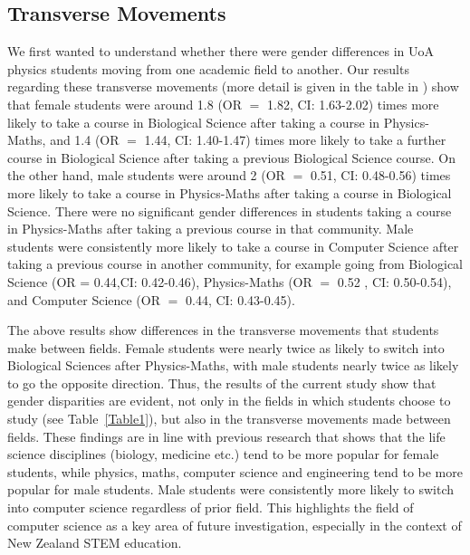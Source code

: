 \subsection{Transverse Movements}
We first wanted to understand whether there were gender differences in UoA physics students moving from one academic field to another. Our results regarding these transverse movements (more detail is given in the table in ) show that female students were around 1.8 (OR $=$ 1.82, CI: 1.63-2.02) times more likely to take a course in Biological Science after taking a course in Physics-Maths, and 1.4 (OR $=$ 1.44, CI: 1.40-1.47) times more likely to take a further course in Biological Science after taking a previous Biological Science course. On the other hand, male students were around 2 (OR $=$ 0.51, CI: 0.48-0.56) times more likely to take a course in Physics-Maths after taking a course in Biological Science. There were no significant gender differences in students taking a course in Physics-Maths after taking a previous course in that community. Male students were consistently more likely to take a course in Computer Science after taking a previous course in another community, for example going from Biological Science (OR = 0.44,CI: 0.42-0.46), Physics-Maths (OR $=$ 0.52 , CI: 0.50-0.54), and Computer Science (OR $=$ 0.44, CI: 0.43-0.45).
 
The above results show differences in the transverse movements that students make between fields. Female students were nearly twice as likely to switch into Biological Sciences after Physics-Maths, with male students nearly twice as likely to go the opposite direction. Thus, the results of the current study show that gender disparities are evident, not only in the fields in which students choose to study (see Table~\ref{Table1}), but also in the transverse movements made between fields. These findings are in line with previous research that shows that the life science disciplines (biology, medicine etc.) tend to be more popular for female students, while physics, maths, computer science and engineering tend to be more popular for male students.\cite{NSF, Cunningham_2015,Kost_Smith_2010,Heilbronner_2012, Stevanovic_2013, InstituteofPhysics_2012, Smith_2011, EducationCounts_2016a, Kennedy_2014, Semela_2010} Male students were consistently more likely to switch into computer science regardless of prior field. This highlights the field of computer science as a key area of future investigation, especially in the context of New Zealand STEM education.

